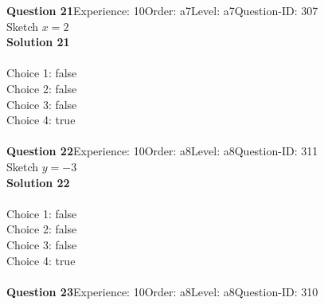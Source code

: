 \documentclass{article}
\begin{document}
\noindent\textbf{Question 21}\hspace{20pt}Experience: 10\hspace{20pt}Order: a7\hspace{20pt}Level: a7\hspace{20pt}Question-ID: 307\\[2pt]
Sketch $x=2$\\[4pt]
\noindent\textbf{Solution 21}\\[2pt]
\\[4pt]
Choice 1: \hspace{20pt} \hspace{20pt}false\\
Choice 2: \hspace{20pt} \hspace{20pt}false\\
Choice 3: \hspace{20pt} \hspace{20pt}false\\
Choice 4: \hspace{20pt} \hspace{20pt}true\\
\\[4pt]
\noindent\textbf{Question 22}\hspace{20pt}Experience: 10\hspace{20pt}Order: a8\hspace{20pt}Level: a8\hspace{20pt}Question-ID: 311\\[2pt]
Sketch $y=-3$\\[4pt]
\noindent\textbf{Solution 22}\\[2pt]
\\[4pt]
Choice 1: \hspace{20pt} \hspace{20pt}false\\
Choice 2: \hspace{20pt} \hspace{20pt}false\\
Choice 3: \hspace{20pt} \hspace{20pt}false\\
Choice 4: \hspace{20pt} \hspace{20pt}true\\
\\[4pt]
\noindent\textbf{Question 23}\hspace{20pt}Experience: 10\hspace{20pt}Order: a8\hspace{20pt}Level: a8\hspace{20pt}Question-ID: 310\\[2pt]
\end{document}
